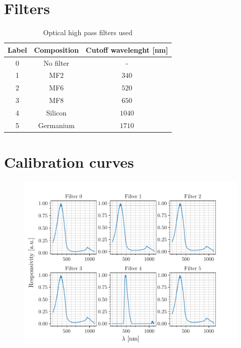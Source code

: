 \section{Filters}
\label{sec:filters}

\begin{table}[htbp]
    \centering
    \begin{tabular}{c c c}
        Label & Composition & Cutoff wavelenght [nm] \\
        \hline
        0 & No filter & - \\
        1 & MF2 & $340$ \\
        2 & MF6 & $520$ \\
        3 & MF8 & $650$ \\
        4 & Silicon & $1040$ \\
        5 & Germanium & $1710$
    \end{tabular}
    \caption{Optical high pass filters used}
    \label{tab:filters}
\end{table}

\section{Calibration curves}
\label{sec:calibration_curves}
\begin{figure}[h]
    \centering
    \includegraphics[scale=1]{figures/filters.pdf}
    \caption{}
    \label{fig:filters}
\end{figure}